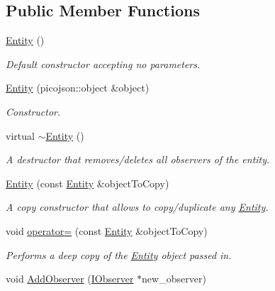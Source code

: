 \subsection*{Public Member Functions}
\begin{DoxyCompactItemize}
\item 
\mbox{\label{classEntity_a980f368aa07ce358583982821533a54a}} 
\hyperlink{classEntity_a980f368aa07ce358583982821533a54a}{Entity} ()
\begin{DoxyCompactList}\small\item\em Default constructor accepting no parameters. \end{DoxyCompactList}\item 
\hyperlink{classEntity_adce4e08d76d3bfcb9703d29e7e03c145}{Entity} (picojson\+::object \&object)
\begin{DoxyCompactList}\small\item\em Constructor. \end{DoxyCompactList}\item 
\mbox{\label{classEntity_a588098978eea6a3486b7361605ff3f0f}} 
virtual \hyperlink{classEntity_a588098978eea6a3486b7361605ff3f0f}{$\sim$\+Entity} ()
\begin{DoxyCompactList}\small\item\em A destructor that removes/deletes all observers of the entity. \end{DoxyCompactList}\item 
\hyperlink{classEntity_ad172cbc40deff00a36d76ab8dcf9a3c2}{Entity} (const \hyperlink{classEntity}{Entity} \&object\+To\+Copy)
\begin{DoxyCompactList}\small\item\em A copy constructor that allows to copy/duplicate any \hyperlink{classEntity}{Entity}. \end{DoxyCompactList}\item 
void \hyperlink{classEntity_abc90e1d87db431ddbabc81776d8bfb04}{operator=} (const \hyperlink{classEntity}{Entity} \&object\+To\+Copy)
\begin{DoxyCompactList}\small\item\em Performs a deep copy of the \hyperlink{classEntity}{Entity} object passed in. \end{DoxyCompactList}\item 
void \hyperlink{classEntity_a13e0fdabb9f5ae73ecd4d7bf7834a3a9}{Add\+Observer} (\hyperlink{classIObserver}{I\+Observer} $\ast$new\+\_\+observer)

\end{DoxyCompactItemize}
